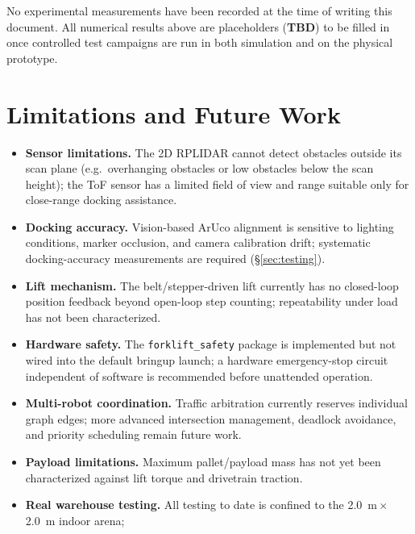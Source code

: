 \documentclass[a4paper, 12pt]{article}
\begin{document}
\begin{warnbox}
No experimental measurements have been recorded at the time of writing
this document. All numerical results above are placeholders (\textbf{TBD})
to be filled in once controlled test campaigns are run in both
simulation and on the physical prototype.
\end{warnbox}

\section{Limitations and Future Work}
\label{sec:future-work}

\begin{itemize}
    \item \textbf{Sensor limitations.} The 2D RPLIDAR cannot detect
    obstacles outside its scan plane (e.g.\ overhanging obstacles or
    low obstacles below the scan height); the ToF sensor has a limited
    field of view and range suitable only for close-range docking
    assistance.
    \item \textbf{Docking accuracy.} Vision-based ArUco alignment is
    sensitive to lighting conditions, marker occlusion, and camera
    calibration drift; systematic docking-accuracy measurements are
    required (\S\ref{sec:testing}).
    \item \textbf{Lift mechanism.} The belt/stepper-driven lift
    currently has no closed-loop position feedback beyond open-loop
    step counting; repeatability under load has not been
    characterized.
    \item \textbf{Hardware safety.} The \texttt{forklift\_safety}
    package is implemented but not wired into the default bringup
    launch; a hardware emergency-stop circuit independent of software
    is recommended before unattended operation.
    \item \textbf{Multi-robot coordination.} Traffic arbitration
    currently reserves individual graph edges; more advanced
    intersection management, deadlock avoidance, and priority
    scheduling remain future work.
    \item \textbf{Payload limitations.} Maximum pallet/payload mass has
    not yet been characterized against lift torque and drivetrain
    traction.
    \item \textbf{Real warehouse testing.} All testing to date is
    confined to the \SI{2.0}{m}\,$\times$\,\SI{2.0}{m} indoor arena;

\end{itemize}
\end{document}
